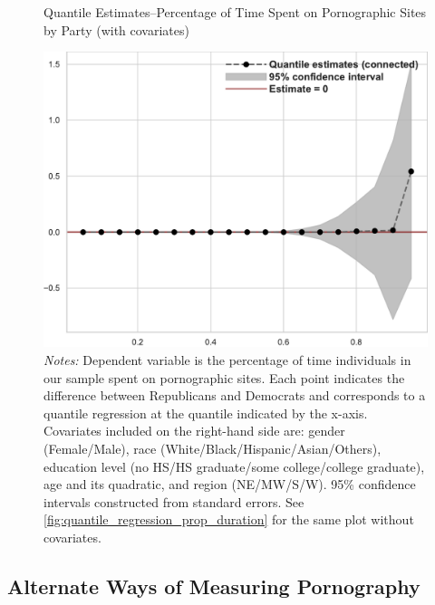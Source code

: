 \documentclass[12pt, letterpaper]{article}
\begin{document}
\begin{figure}[ht]
	\centering
	\caption{Quantile Estimates--Percentage of Time Spent on Pornographic Sites by Party (with covariates)}
	\includegraphics[width=.55\linewidth]{../figs/quantile_reg_covariates_proportion_duration_adult.pdf}
	\caption*{\footnotesize \emph{Notes:} 
		Dependent variable is the percentage of time individuals in our sample spent on pornographic sites.
		Each point indicates the difference between Republicans and Democrats and corresponds to a quantile regression at the quantile indicated by the x-axis.
		Covariates included on the right-hand side are: gender (Female/Male), race (White/Black/Hispanic/Asian/Others), education level (no HS/HS graduate/some college/college graduate), age and its quadratic, and region (NE/MW/S/W).
		95\% confidence intervals constructed from standard errors.
		See \cref{fig:quantile_regression_prop_duration} for the same plot without covariates.
	}
	\label{fig:quantile_regression_prop_duration_covariates}
\end{figure}
\clearpage

\FloatBarrier
\subsection{Alternate Ways of Measuring Pornography}
\label{si:alternate_ways}
\clearpage
\end{document}
